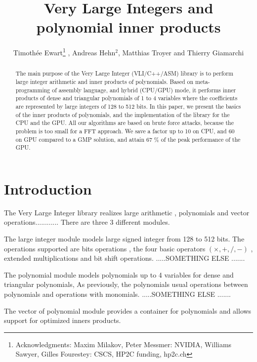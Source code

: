 \documentclass[oribibl]{llncs2e/llncs}
\title{Very Large Integers  and polynomial inner products}
\author{Timoth\'ee Ewart\inst{1}\thanks{Acknowledgments: Maxim Milakov, Peter Messmer:   NVIDIA,   Williams Sawyer, Gilles Fourestey:  CSCS, HP2C funding, hp2c.ch}  , Andreas Hehn$^2$, Matthias Troyer\inst{2} and Thierry Giamarchi\inst{1}}
\institute{Universit\'e de Gen\`eve, \email{timothee.ewart@gmail.com}  \and Eidgen\"ossische Technische Hochschule Z\"urich }
\begin{document}
\maketitle
\begin{abstract}
The main purpose of the  Very Large Integer (VLI/C++/ASM) library is to perform large integer arithmetic and  inner products of polynomials. Based on meta-programming of assembly language,
and  hybrid (CPU/GPU) mode, it performs inner products of dense and triangular polynomials  of 1 to 4 variables  where the coefficients are represented  by large integers of 128 to 512 bits. 
In this paper, we present the basics of the inner products of polynomials, and  the implementation of the library for the CPU and the GPU.  All our algorithms are based on brute force attacks, because the problem is too small for a FFT approach. We save a factor up to 10 on CPU, and 60 on GPU compared to a GMP solution,
and attain 67 \% of the peak performance of the GPU.
\end{abstract}
\section{Introduction}

The Very Large Integer library realizes large arithmetic , polynomials  and vector operations............ There are three 3 different modules. 

The large integer module models large signed integer from 128 to 512 bits. The operations supported are bits operations , the four basic operators $(\times,+,/,-)$ , extended multiplications and bit shift operations. .....SOMETHING ELSE .......

The polynomial module models polynomials up to 4 variables for dense and triangular polynomials, As previously, the polynomials usual  operations between polynomials and operations with monomials.  .....SOMETHING ELSE .......

The vector of polynomial module provides a container for polynomials and allows support for optimized inners products.
\end{document}

